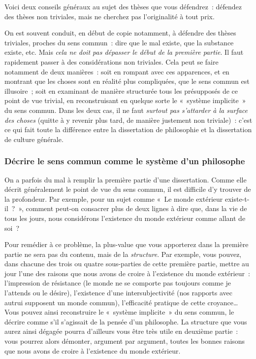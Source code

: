 \documentclass[a4paper]{article}
\begin{document}
Voici deux conseils généraux au sujet des thèses que vous défendrez :
défendez des thèses non triviales, mais ne cherchez pas l'originalité à
tout prix.

On est souvent conduit, en début de copie notamment, à défendre des
thèses triviales, proches du sens commun : dire que le mal existe, que
la substance existe, etc. Mais \emph{cela ne doit pas dépasser le début de la première partie}. Il faut rapidement passer à des considérations non
triviales. Cela peut se faire notamment de deux manières : soit en
rompant avec ces apparences, et en montrant que les choses sont en
réalité plus compliquées, que le sens commun est illusoire ; soit en
examinant de manière structurée tous les présupposés de ce point de vue
trivial, en reconstruisant en quelque sorte le « système implicite » du
sens commun. Dans les deux cas, il ne faut \emph{surtout pas s'attarder à la surface des choses} (quitte à y revenir plus tard, de manière justement
non triviale) : c'est ce qui fait toute la différence entre la
dissertation de philosophie et la dissertation de culture générale.
\subsubsection{Décrire le sens commun comme le système d'un philosophe}
\label{sec-3-2-3}


On a parfois du mal à remplir la première partie d'une dissertation.
Comme elle décrit généralement le point de vue du sens commun, il est
difficile d'y trouver de la profondeur. Par exemple, pour un sujet comme
« Le monde extérieur existe-t-il ? », comment peut-on consacrer plus de
deux lignes à dire que, dans la vie de tous les jours, nous considérons
l'existence du monde extérieur comme allant de soi ?

Pour remédier à ce problème, la plus-value que vous apporterez dans la
première partie ne sera pas du contenu, mais de la \emph{structure}. Par
exemple, vous pouvez, dans chacune des trois ou quatre sous-parties de
cette première partie, mettre au jour l'une des raisons que nous avons
de croire à l'existence du monde extérieur : l'impression de résistance
(le monde ne se comporte pas toujours comme je l'attends ou le désire),
l'existence d'une intersubjectivité (nos rapports avec autrui supposent
un monde commun), l'efficacité pratique de cette croyance\ldots{} Vous pouvez
ainsi reconstruire le « système implicite » du sens commun, le décrire
comme s'il s'agissait de la pensée d'un philosophe. La structure que
vous aurez ainsi dégagée pourra d'ailleurs vous être très utile en
deuxième partie : vous pourrez alors démonter, argument par argument,
toutes les bonnes raisons que nous avons de croire à l'existence du
monde extérieur.
\end{document}
